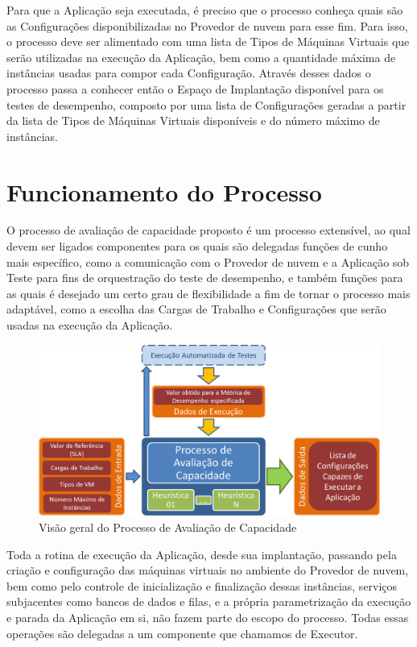 Para que a Aplicação seja executada, é preciso que o processo conheça quais são
as Configurações disponibilizadas no Provedor de nuvem para esse fim. Para isso,
o processo deve ser alimentado com uma lista de Tipos de Máquinas Virtuais que
serão utilizadas na execução da Aplicação, bem como a quantidade máxima de 
instâncias usadas para compor cada Configuração. Através desses dados o processo
passa a conhecer então o Espaço de Implantação disponível para os testes de 
desempenho, composto por uma lista de Configurações geradas a partir da lista de
Tipos de Máquinas Virtuais disponíveis e do número máximo de instâncias.

\section{Funcionamento do Processo}

O processo de avaliação de capacidade proposto é um processo extensível, ao qual
devem ser ligados componentes para os quais são delegadas funções de cunho mais
específico, como a comunicação com o Provedor de nuvem e a Aplicação sob Teste
para fins de orquestração do teste de desempenho, e também funções para as quais
é desejado um certo grau de flexibilidade a fim de tornar o processo mais adaptável,
como a escolha das Cargas de Trabalho e Configurações que serão usadas na execução
da Aplicação.

\begin{figure}[htb]
  \caption{\label{fig_processo_alto_nivel}Visão geral do Processo de Avaliação de Capacidade}
  \begin{center}
    \includegraphics[scale=0.5]{img/processoAltoNivel}
  \end{center}
\end{figure}

Toda a rotina de execução da Aplicação, desde sua implantação, passando pela 
criação e configuração das máquinas virtuais no ambiente do Provedor de nuvem, 
bem como pelo controle de inicialização e finalização dessas instâncias, serviços
subjacentes como bancos de dados e filas, e a própria parametrização da execução
e parada da Aplicação em si, não fazem parte do escopo do processo. Todas essas
operações são delegadas a um componente que chamamos de Executor. 

